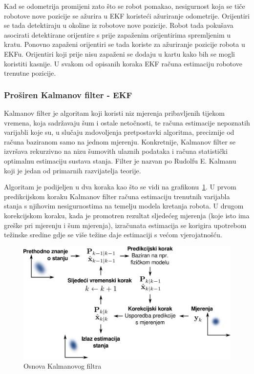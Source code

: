 Kad se odometrija promijeni zato što se robot pomakao, nesigurnost koja se
tiče robotove nove pozicije se ažurira u EKF koristeći ažuriranje
odometrije. Orijentiri se tada detektiraju u okoline iz robotove nove
pozicije. Robot tada pokušava asocirati detektirane orijentire s prije zapaženim
orijentirima spremljenim u kratu. Ponovno zapaženi orijentiri se tada koriste za ažuriranje
pozicije robota u EKFu. Orijentiri koji prije nisu zapaženi se dodaju u
kartu kako bih se mogli koristiti kasnije. U svakom od opisanih koraka EKF
računa estimaciju robotove trenutne pozicije. 

\newpage
\subsubsection{Proširen Kalmanov filter - EKF} %
\label{ssub:Proširen Kalmanov filter - EKF}

Kalmanov filter je algoritam koji koristi niz mjerenja pribavljenih
tijekom vremena, koja sadržavaju šum i ostale netočnosti, te računa
estimacije nepoznatih varijabli koje su, u slučaju zadovoljenja
pretpostavki algoritma, preciznije od računa baziranom samo na jednom
mjerenju. Konkretnije, Kalmanov filter se izvršava rekurzivno na nizu
šumovith ulaznih podataka i računa statistički optimalnu estimaciju
sustava stanja. Filter je nazvan po Rudolfu E. Kalmanu~\cite{Kalman}
koji je jedan od primarnih razvijatelja teorije.


Algoritam je podijeljen u dva koraka kao što se vidi na
grafikonu~\ref{fig:basic-kalman}. U prvom predikcijskom koraku Kalmanov
filter računa estimaciju trenutnih varijabla stanja s njihovim
nesigurnostima na temelju modela kretanja robota. U drugom korekcijskom
koraku, kada je promotren rezultat sljedećeg mjerenja (koje isto ima
greške pri mjerenju i šum mjerenja), izračunata estimacija se korigira
upotrebom težinske sredine gdje se više težine daje estimaciji s većom
vjerojatnošću.

\begin{figure}[H]
\centering
\renewcommand{\figurename}{Grafikon}
\includegraphics[scale=0.35]{figures/basic-kalman.pdf}
\caption{Osnova Kalmanovog filtra}
\label{fig:basic-kalman}
\end{figure}

